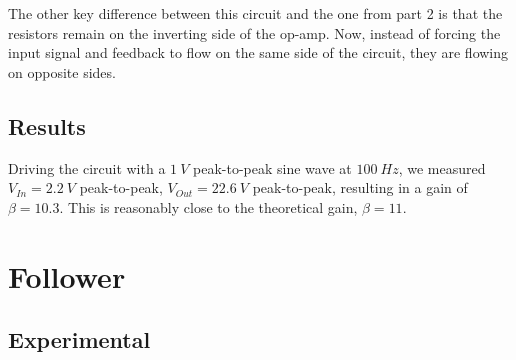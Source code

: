 \documentclass[11pt]{article}
\begin{document}
The other key difference between this circuit and the one from part 2 is that the resistors remain on the inverting side of the op-amp. Now, instead of forcing the input signal and feedback to flow on the same side of the circuit, they are flowing on opposite sides.


\subsection{Results}

Driving the circuit with a $1\ V$ peak-to-peak sine wave at $100\ Hz$, we measured $V_{In} = 2.2\ V$ peak-to-peak, $V_{Out} = 22.6\ V$ peak-to-peak, resulting in a gain of $\beta = 10.3$. This is reasonably close to the theoretical gain, $\beta = 11$.


\section{Follower}
\subsection{Experimental}
\end{document}
